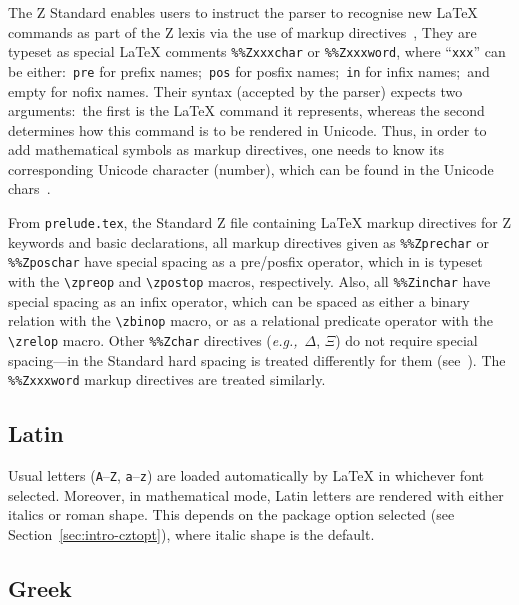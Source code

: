 \documentclass{article}
\newcommand{\emfile}[1]{\texttt{#1}}%
\newcommand{\preludefile}{\emfile{prelude.tex}}
\begin{document}
The Z Standard enables users to instruct the parser to recognise new \LaTeX{}
commands as part of the Z lexis via the use of markup directives~\cite[A.2.3]{isoz},
They are typeset as special \LaTeX{} comments \verb|%%Zxxxchar| or \verb|%%Zxxxword|,
where ``\verb|xxx|'' can be either:~\verb|pre| for prefix names;~\verb|pos| for
posfix names;~\verb|in| for infix names;~and empty for nofix names. Their syntax
(accepted by the parser) expects two arguments:~the first is the \LaTeX{} command
it represents, whereas the second determines how this command is to be rendered in Unicode.
Thus, in order to add mathematical symbols as markup directives, one needs to know its
corresponding Unicode character (number), which can be found in the Unicode chars~\cite{unicode}.

From \preludefile, the Standard Z file containing \LaTeX{} markup directives for
Z keywords and basic declarations, all markup directives given as \verb|%%Zprechar|
or \verb|%%Zposchar| have special spacing as a pre/posfix operator, which in \cztstylefile{}
is typeset with the \verb|\zpreop| and \verb|\zpostop| macros, respectively.
Also, all \verb|%%Zinchar| have special spacing as an infix operator, which can be
spaced as either a binary relation with the \verb|\zbinop| macro, or as a relational predicate
operator with the \verb|\zrelop| macro. Other \verb|%%Zchar| directives (\textit{e.g.,}~$\Delta$, $\Xi$)
do not require special spacing---in the Standard hard spacing is treated differently for them
(see~\cite[A.6.28.2]{isoz}). The \verb|%%Zxxxword| markup directives are treated similarly.

\subsection{Latin}\label{sec:letters-latin}

Usual letters (\texttt{A}--\texttt{Z}, \texttt{a}--\texttt{z}) are
loaded automatically by \LaTeX{} in whichever font selected.
Moreover, in mathematical mode, Latin letters are rendered with either
italics or roman shape. This depends on the package option selected
(see Section~\ref{sec:intro-cztopt}), where italic shape is the default.

\subsection{Greek}\label{sec:letters-greek}
\end{document}
